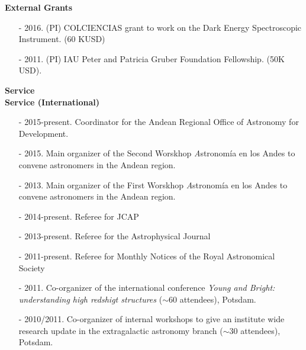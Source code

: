 \documentclass[letterpaper,11pt,onecolumn]{article}
\begin{document}
{\bf External Grants}
\begin{itemize}
\item[-] 2016. (PI) COLCIENCIAS grant to work on the Dark
  Energy Spectroscopic Instrument. (60 KUSD)
\item[-] 2011. (PI) IAU Peter and Patricia Gruber Foundation
  Fellowship. (50K USD).


\end{itemize}

\noindent
{\Large \bf Service}\\

{\bf Service (International)}
\begin{itemize}
\item[-] 2015-present. Coordinator for the Andean Regional Office of
  Astronomy for Development.
\item[-] 2015. Main organizer of the Second Worskhop {\textit Astronom\'ia en
  los Andes} to convene astronomers in the Andean region.  
\item[-] 2013. Main organizer of the First Worskhop {\textit Astronom\'ia en
  los Andes} to convene astronomers in the Andean region.  
\item[-] 2014-present. Referee for JCAP  %
\item[-] 2013-present. Referee for the Astrophysical Journal %
\item[-] 2011-present. Referee for Monthly Notices of the Royal
  Astronomical Society %
\item[-] 2011. Co-organizer of the international conference {\it Young
  and Bright: understanding high redshigt structures} ($\sim 60$
  attendees), Potsdam. 
\item[-] 2010/2011. Co-organizer of internal workshops to give an
  institute wide research update in the extragalactic astronomy branch
  ($\sim 30$ attendees), Potsdam. 
\end{itemize}
\end{document}
